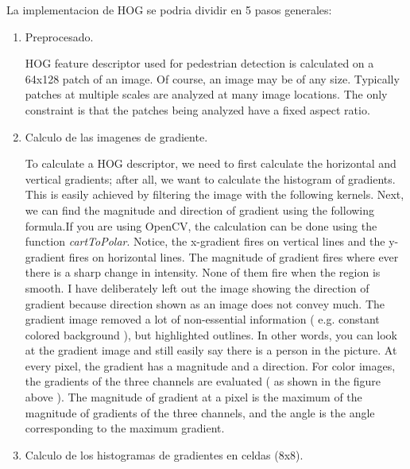 La implementacion de HOG se podria dividir en 5 pasos generales:
\begin{enumerate}
	\item Preprocesado.
	
	HOG feature descriptor used for pedestrian detection is calculated on a 64x128 patch of an image. Of course, an image may be of any size. Typically patches at multiple scales are analyzed at many image locations. The only constraint is that the patches being analyzed have a fixed aspect ratio.
	
	\item Calculo de las imagenes de gradiente.
	
	To calculate a HOG descriptor, we need to first calculate the horizontal and vertical gradients; after all, we want to calculate the histogram of gradients. This is easily achieved by filtering the image with the following kernels.
	Next, we can find the magnitude and direction of gradient using the following formula.If you are using OpenCV, the calculation can be done using the function \textit{cartToPolar}.
	Notice, the x-gradient fires on vertical lines and the y-gradient fires on horizontal lines. The magnitude of gradient fires where ever there is a sharp change in intensity. None of them fire when the region is smooth. I have deliberately left out the image showing the direction of gradient because direction shown as an image does not convey much.
	The gradient image removed a lot of non-essential information ( e.g. constant colored background ), but highlighted outlines. In other words, you can look at the gradient image and still easily say there is a person in the picture.
	At every pixel, the gradient has a magnitude and a direction. For color images, the gradients of the three channels are evaluated ( as shown in the figure above ). The magnitude of gradient at a pixel is the maximum of the magnitude of gradients of the three channels, and the angle is the angle corresponding to the maximum gradient.
	
	\item Calculo de los histogramas de gradientes en celdas (8x8).
	

\end{enumerate}
